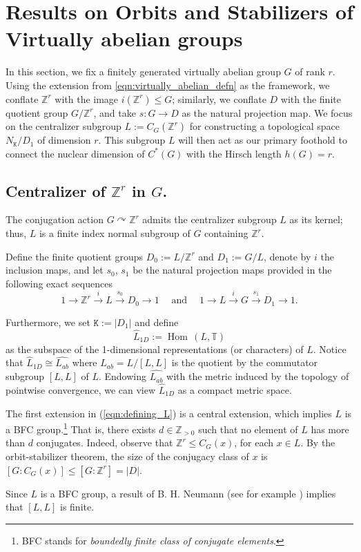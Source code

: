 \documentclass[11pt, twoside]{amsart}
\newcommand{\te}[1]{\operatorname{#1}}
\newcommand{\zn}{\mathbb{Z}}
\newcommand{\mt}{\mathtt}
\newcommand{\wh}{\widehat}
\theoremstyle{definition}
\newcommand{\B}{\mathbb}
\newcommand{\Z}{\B{Z}}
\newcommand{\T}{\B{T}}
\begin{document}
\section{Results on Orbits and Stabilizers of Virtually abelian groups}
\label{sec:orbs-stabs}

In this section, we fix a finitely generated virtually abelian group $G$ of rank $r$. Using the extension from \eqref{eqn:virtually_abelian_defn} as the framework, we conflate $\Z^r$ with the image $i(\Z^r)\leq G$; similarly, we conflate $D$ with the finite quotient group $G/\Z^r$, and take $s\colon G\to D$ as the natural projection map. We focus on the centralizer subgroup $L:=C_G(\Z^r)$ for constructing a topological space $N_{\mt{K}}/D_1$ of dimension $r$. This subgroup $L$ will then act as our primary foothold to connect the nuclear dimension of $C^*(G)$ with the Hirsch length $h(G)=r$. 

\subsection{Centralizer of $\zn^r$ in $G$.}\label{subsec:centralizer} The conjugation action $G\curvearrowright \Z^r$ admits the centralizer subgroup $L$ as its kernel; thus, $L$ is a finite index normal subgroup of $G$ containing $\Z^r$.

Define the finite quotient groups $D_0:=L/\Z^r$ and $D_1:=G/L$, denote by $i$ the inclusion maps, and let $s_0$, $s_1$ be the natural projection maps provided in the following exact sequences
\begin{equation}
    \label{eqn:defining_L}
     1\rightarrow \Z^r\stackrel{i}{\rightarrow} L\stackrel{s_0}{\rightarrow}D_0\rightarrow 1\quad\te{ and }\quad     1\rightarrow L\stackrel{i}{\rightarrow} G\stackrel{s_1}{\rightarrow}D_1\rightarrow 1.
\end{equation}

\noindent Furthermore, we set $\mt{K}:=|D_1|$ and define
\[\wh{L}_{1D}:=\te{Hom}\,(L,\T)\] 
as the subspace of the 1-dimensional representations (or characters) of $L$. Notice that $\wh{L}_{1D}\cong \widehat{L_{ab}}$ where $L_{ab}=L/[L,L]$ is the
quotient by the commutator subgroup $[L,L]$ of $L$. Endowing $\wh{L_{ab}}$ with the metric induced by the topology of pointwise convergence, we can view $\wh{L}_{1D}$ as a compact metric space.  \par

The first extension in (\ref{eqn:defining_L}) is a central extension, which implies $L$ is a BFC group.\footnote{BFC stands for \textit{boundedly finite class of conjugate elements}.} That is, there exists $d\in\zn_{>0}$ such that no element of $L$ has more than $d$ conjugates. Indeed, observe that $\zn^r\leq C_G(x)$, for each $x\in L$. By the orbit-stabilizer theorem, the size of the conjugacy class of $x$ is $[G:C_G(x)]\leq [G:\Z^r]=|D|$.\par
 Since $L$ is a BFC group, a result of B. H. Neumann (see for example \cite[14.5.11]{robinson_group_theory_book}) implies that $[L,L]$ is finite.
\end{document}
